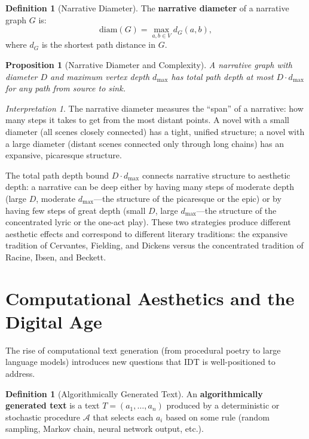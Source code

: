 \documentclass[11pt,openany]{book}
\theoremstyle{definition}
\newtheorem{definition}[axiom]{Definition}
\theoremstyle{plain}
\newtheorem{proposition}[axiom]{Proposition}
\theoremstyle{remark}
\newtheorem{interpretation}[axiom]{Interpretation}
\begin{document}
\begin{definition}[Narrative Diameter]
The \textbf{narrative diameter} of a narrative graph $G$ is:
\[
\mathrm{diam}(G) = \max_{a, b \in V} d_G(a, b),
\]
where $d_G$ is the shortest path distance in $G$.
\end{definition}

\begin{proposition}[Narrative Diameter and Complexity]
A narrative graph with diameter $D$ and maximum vertex depth $d_{\max}$ has total path depth at most $D \cdot d_{\max}$ for any path from source to sink.
\end{proposition}

\begin{interpretation}
The narrative diameter measures the ``span'' of a narrative: how many steps it takes to get from the most distant points. A novel with a small diameter (all scenes closely connected) has a tight, unified structure; a novel with a large diameter (distant scenes connected only through long chains) has an expansive, picaresque structure.

The total path depth bound $D \cdot d_{\max}$ connects narrative structure to aesthetic depth: a narrative can be deep either by having many steps of moderate depth (large $D$, moderate $d_{\max}$---the structure of the picaresque or the epic) or by having few steps of great depth (small $D$, large $d_{\max}$---the structure of the concentrated lyric or the one-act play). These two strategies produce different aesthetic effects and correspond to different literary traditions: the expansive tradition of Cervantes, Fielding, and Dickens versus the concentrated tradition of Racine, Ibsen, and Beckett.
\end{interpretation}

\section{Computational Aesthetics and the Digital Age}

The rise of computational text generation (from procedural poetry to large language models) introduces new questions that IDT is well-positioned to address.

\begin{definition}[Algorithmically Generated Text]
An \textbf{algorithmically generated text} is a text $T = (a_1, \ldots, a_n)$ produced by a deterministic or stochastic procedure $\mathcal{A}$ that selects each $a_i$ based on some rule (random sampling, Markov chain, neural network output, etc.).
\end{definition}
\end{document}
